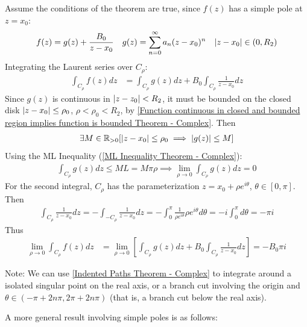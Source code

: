 \documentclass[12pt, english]{book}
\makeatletter
\renewenvironment{proof}[1][\proofname]{\par
	\pushQED{\qed}%
	\normalfont \topsep6\p@\@plus6\p@\relax
	\list{}{%
		\settowidth{\leftmargin}{\itshape\proofname:\hskip\labelsep}%
		\setlength{\labelwidth}{0pt}%
		\setlength{\itemindent}{-\leftmargin}%
		}%
	\item[\hskip\labelsep\itshape#1\@addpunct{:}]\ignorespaces
	}{\popQED\endlist\@endpefalse}
\makeatother
\begin{document}
	\begin{proof}
		Assume the conditions of the theorem are true, since \(f(z)\) has a simple pole at \(z = x_0\):
		\begin{align*}
			f(z) &= g(z) + \frac{B_0}{z-x_0} & g(z) &= \sum_{n=0}^{\infty} a_n (z-x_0)^n
				& \abs{z-x_0} \in (0, R_2)
		\end{align*}
		Integrating the Laurent series over \(C_\rho\):
		\begin{align*}
			\int_{C_\rho} f(z) dz
			&= \int_{C_\rho} g(z) dz +  B_0 \int_{C_\rho} \frac{1}{z-x_0} dz 
		\end{align*}
		Since \(g(z)\) is continuous in \(\abs{z-z_0} < R_2\), it must be bounded on the closed disk \(\abs{z-x_0} \leq \rho_0\), \(\rho < \rho_0 < R_2\), by \cref{Function continuous in closed and bounded region implies function is bounded Theorem - Complex}. Then
		\begin{align*}
			\exists M \in \mathbb{R}_{>0} [\abs{z-x_0} \leq \rho_0 \implies \abs{g(z)} \leq M]
		\end{align*}
		Using the ML Inequality (\cref{ML Inequality Theorem - Complex}):
		\begin{align*}
			\int_{C_\rho} g(z) dz \leq ML = M\pi \rho
			\implies \lim_{\rho \rightarrow 0} \int_{C_\rho} g(z) dz = 0
		\end{align*}
		For the second integral, \(C_\rho\) has the parameterization \(z = x_0 + \rho e^{i\theta}\), \(\theta \in [0, \pi]\). Then
		\begin{align*}
			\int_{C_\rho} \frac{1}{z-x_0} dz 
			= - \int_{-C_\rho} \frac{1}{z-x_0} dz 
			= - \int_{0}^{\pi} \frac{1}{\rho e^{i\theta}} \rho e^{i\theta} d\theta 
			= -i \int_{0}^{\pi} d\theta = -\pi i
		\end{align*}
		Thus
		\begin{align*}
			\lim_{\rho \rightarrow 0} \int_{C_\rho} f(z) dz
			&= \lim_{\rho \rightarrow 0} \left[ \int_{C_\rho} g(z) dz + B_0 \int_{C_\rho} \frac{1}{z-x_0} dz \right] 
			 = - B_0 \pi i
		\end{align*}
	\end{proof}

	Note: We can use \cref{Indented Paths Theorem - Complex} to integrate around a isolated singular point on the real axis, or a branch cut involving the origin and \(\theta \in (-\pi + 2n\pi, 2\pi + 2n\pi)\) (that is, a branch cut below the real axis).

	A more general result involving simple poles is as follows:
	
\end{document}
